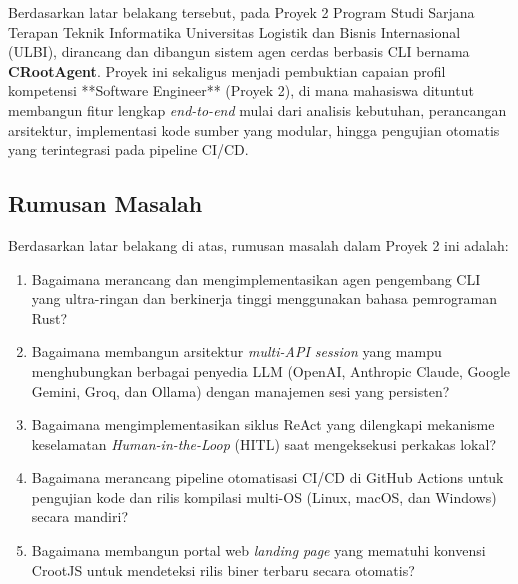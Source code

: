 Berdasarkan latar belakang tersebut, pada Proyek 2 Program Studi Sarjana Terapan Teknik Informatika Universitas Logistik dan Bisnis Internasional (ULBI), dirancang dan dibangun sistem agen cerdas berbasis CLI bernama \textbf{CRootAgent}. Proyek ini sekaligus menjadi pembuktian capaian profil kompetensi **Software Engineer** (Proyek 2), di mana mahasiswa dituntut membangun fitur lengkap \textit{end-to-end} mulai dari analisis kebutuhan, perancangan arsitektur, implementasi kode sumber yang modular, hingga pengujian otomatis yang terintegrasi pada pipeline CI/CD.

\subsection{Rumusan Masalah}
Berdasarkan latar belakang di atas, rumusan masalah dalam Proyek 2 ini adalah:
\begin{enumerate}
    \item Bagaimana merancang dan mengimplementasikan agen pengembang CLI yang ultra-ringan dan berkinerja tinggi menggunakan bahasa pemrograman Rust?
    \item Bagaimana membangun arsitektur \textit{multi-API session} yang mampu menghubungkan berbagai penyedia LLM (OpenAI, Anthropic Claude, Google Gemini, Groq, dan Ollama) dengan manajemen sesi yang persisten?
    \item Bagaimana mengimplementasikan siklus ReAct yang dilengkapi mekanisme keselamatan \textit{Human-in-the-Loop} (HITL) saat mengeksekusi perkakas lokal?
    \item Bagaimana merancang pipeline otomatisasi CI/CD di GitHub Actions untuk pengujian kode dan rilis kompilasi multi-OS (Linux, macOS, dan Windows) secara mandiri?
    \item Bagaimana membangun portal web \textit{landing page} yang mematuhi konvensi CrootJS untuk mendeteksi rilis biner terbaru secara otomatis?
\end{enumerate}


